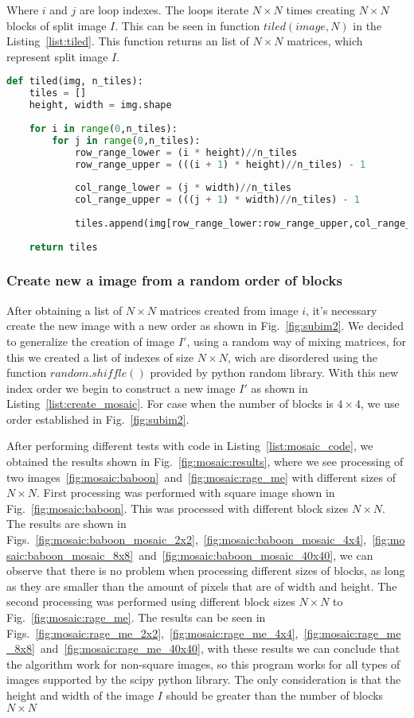 \documentclass[journal]{IEEEtran}
\begin{document}
Where $i$ and $j$ are loop indexes. The loops iterate $N \times N$ times creating $N \times N$ blocks of split image $I$. This can be seen in function $tiled(image, N)$ in the Listing~\ref{list:tiled}. This function returns an list of $N\times N$ matrices, which represent split image $I$.

\begin{lstlisting}[language=Python, caption=Image split function, label=list:tiled]
def tiled(img, n_tiles):
	tiles = []
	height, width = img.shape
	
	for i in range(0,n_tiles):
		for j in range(0,n_tiles):
			row_range_lower = (i * height)//n_tiles
			row_range_upper = (((i + 1) * height)//n_tiles) - 1
			
			col_range_lower = (j * width)//n_tiles
			col_range_upper = (((j + 1) * width)//n_tiles) - 1
			
			tiles.append(img[row_range_lower:row_range_upper,col_range_lower:col_range_upper])
	
	return tiles
\end{lstlisting}

\subsubsection{Create new a image from a random order of blocks}
After obtaining a list of $N \times N$ matrices created from image $i$, it's necessary create the new image with a new order as shown in Fig.~\ref{fig:subim2}. We decided to generalize the creation of image $I'$, using a random way of mixing matrices, for this we created a list of indexes of size $N \times N$, wich are disordered using the function $random.shiffle()$ provided by python random library. With this new index order we begin to construct a new image $I'$ as shown in Listing~\ref{list:create_mosaic}. For case when the number of blocks is $4 \times 4$, we use order established in Fig.~\ref{fig:subim2}.

After performing different tests with code in Listing~\ref{list:mosaic_code}, we obtained the results shown in Fig.~\ref{fig:mosaic:results}, where we see processing of two images~\ref{fig:mosaic:baboon}~and~\ref{fig:mosaic:rage_me} with different sizes of $N \times N$.
First processing was performed with square image shown in Fig.~\ref{fig:mosaic:baboon}. This was processed with different block sizes $N \times N$. The results are shown in Figs.~\ref{fig:mosaic:baboon_mosaic_2x2},~\ref{fig:mosaic:baboon_mosaic_4x4},~\ref{fig:mosaic:baboon_mosaic_8x8}~and~\ref{fig:mosaic:baboon_mosaic_40x40}, we can observe that there is no problem when processing different sizes of blocks, as long as they are smaller than the amount of pixels that are of width and height.
The second processing was performed using different block sizes $N \times N$ to Fig.~\ref{fig:mosaic:rage_me}. The results can be seen in Figs.~\ref{fig:mosaic:rage_me_2x2},~\ref{fig:mosaic:rage_me_4x4},~\ref{fig:mosaic:rage_me_8x8}~and~\ref{fig:mosaic:rage_me_40x40}, with these results we can conclude that the algorithm work for non-square images, so this program works for all types of images supported by the scipy python library. The only consideration is that the height and width of the image $I$ should be greater than the number of blocks $N \times N$
\end{document}

